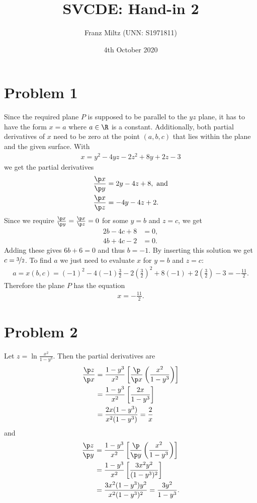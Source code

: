 \documentclass{article}
\begin{document}
\title{SVCDE: Hand-in 2}
\author{Franz Miltz (UNN: S1971811)}
\date{4th October 2020}
\maketitle
\section*{Problem 1}
Since the required plane $P$ is supposed to be parallel to the $yz$ plane, it
has to have the form $x=a$ where $a\in\R$ is a constant.
Additionally, both partial derivatives of $x$ need to be zero at the
point $(a,b,c)$ that lies within the plane and the given surface.
With
\begin{align*}
  x = y^2 - 4yz - 2z^2 + 8y + 2z -3
\end{align*}
we get the partial derivatives
\begin{align*}
  \frac{\p x}{\p y} & =2y - 4z + 8,\text{ and} \\
  \frac{\p x}{\p z} & =-4y-4z+2.
\end{align*}
Since we require $\frac{\p x}{\p y}=\frac{\p x}{\p z}=0$ for
some $y=b$ and $z=c$, we get
\begin{align*}
  2b - 4c + 8 & = 0, \\
  4b + 4c - 2 & = 0.
\end{align*}
Adding these gives $6b + 6 = 0$ and thus $b=-1$.
By inserting this solution we get $c=\nicefrac{3}{2}$.
To find $a$ we just need to evaluate $x$ for $y=b$ and $z=c$:
\begin{align*}
  a = x(b,c) = (-1)^2 - 4(-1)\frac{3}{2} - 2\left(\frac{3}{2}\right)^2
  + 8(-1) + 2\left(\frac{3}{2}\right) - 3 = - \frac{11}{2}.
\end{align*}
Therefore the plane $P$ has the equation
\begin{align*}
  x = -\frac{11}{2}.
\end{align*}
\section*{Problem 2}
Let $ z = \ln\frac{x^2}{1-y^3}$. Then the partial derivatives are
\begin{align*}
  \frac{\p z}{\p x}
   & =\frac{1-y^3}{x^2}\left[\frac{\p}{\p x}\left(\frac{x^2}{1-y^3}\right)\right] \\
   & =\frac{1-y^3}{x^2}\left[\frac{2x}{1-y^3}\right]                              \\
   & =\frac{2x(1-y^3)}{x^2(1-y^3)}=\frac{2}{x}
\end{align*}
and
\begin{align*}
  \frac{\p z}{\p y}
   & =\frac{1-y^3}{x^2}\left[\frac{\p}{\p y}\left( \frac{x^2}{1-y^3}\right)\right] \\
   & =\frac{1-y^3}{x^2}\left[\frac{3x^2y^2}{(1-y^3)^2}\right]                      \\
   & =\frac{3x^2(1-y^3)y^2}{x^2(1-y^3)^2} =\frac{3y^2}{1-y^3}.
\end{align*}
\end{document}
